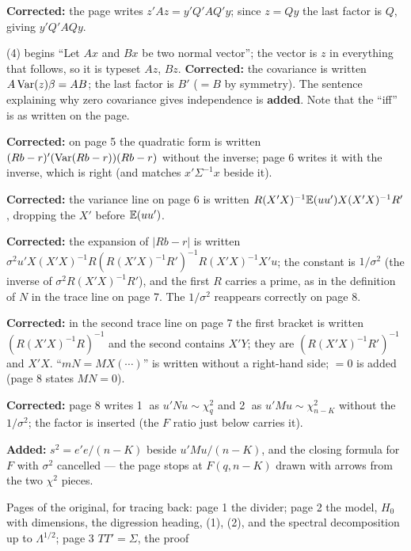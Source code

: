 \documentclass[11pt]{article}
\begin{document}
\begin{transcriptnotes}
        \textbf{Corrected:} the page writes $z'Az = y'Q'AQ'y$; since $z = Qy$
        the last factor is $Q$, giving $y'Q'AQy$.
  \item (4) begins ``Let $Ax$ and $Bx$ be two normal vector''; the vector is $z$ in
        everything that follows, so it is typeset $Az$, $Bz$. \textbf{Corrected:} the
        covariance is written $A\operatorname{Var}(z)\beta = AB$; the last factor is $B'$ ($= B$ by
        symmetry). The sentence explaining why zero covariance gives independence is
        \textbf{added}. Note that the ``iff'' is as written on the page.
  \item \textbf{Corrected:} on page 5 the quadratic form is written
        $(Rb - r)'(\operatorname{Var}(Rb - r))(Rb - r)$ without the inverse; page 6 writes it with
        the inverse, which is right (and matches $x'\Sigma^{-1}x$ beside it).
  \item \textbf{Corrected:} the variance line on page 6 is written
        $R(X'X)^{-1}\mathbb{E}(uu')X(X'X)^{-1}R'$, dropping the $X'$ before $\mathbb{E}(uu')$.
  \item \textbf{Corrected:} the expansion of $|Rb - r|$ is written
        $\sigma^{2}u'X(X'X)^{-1}R(R(X'X)^{-1}R')^{-1}R(X'X)^{-1}X'u$; the constant is
        $1/\sigma^{2}$ (the inverse of $\sigma^{2}R(X'X)^{-1}R'$), and the first $R$
        carries a prime, as in the definition of $N$ in the trace line on page 7.
        The $1/\sigma^{2}$ reappears correctly on page 8.
  \item \textbf{Corrected:} in the second trace line on page 7 the first bracket is
        written $(R(X'X)^{-1}R)^{-1}$ and the second contains $X'Y$; they are
        $(R(X'X)^{-1}R')^{-1}$ and $X'X$. ``$mN = MX(\cdots)$'' is written without a
        right-hand side; $= 0$ is added (page 8 states $MN = 0$).
  \item \textbf{Corrected:} page 8 writes \textcircled{\scriptsize 1} as $u'Nu \sim \chi^{2}_{q}$ and
        \textcircled{\scriptsize 2} as $u'Mu \sim \chi^{2}_{n-K}$ without the $1/\sigma^{2}$; the
        factor is inserted (the $F$ ratio just below carries it).
  \item \textbf{Added:} $s^{2} = e'e/(n-K)$ beside $u'Mu/(n-K)$, and the closing
        formula for $F$ with $\sigma^{2}$ cancelled --- the page stops at
        $F(q, n - K)$ drawn with arrows from the two $\chi^{2}$ pieces.
  \item Pages of the original, for tracing back: page 1 the divider; page 2 the
        model, $H_{0}$ with dimensions, the digression heading, (1), (2), and the
        spectral decomposition up to $\Lambda^{1/2}$; page 3 $TT' = \Sigma$, the proof

\end{transcriptnotes}
\end{document}
